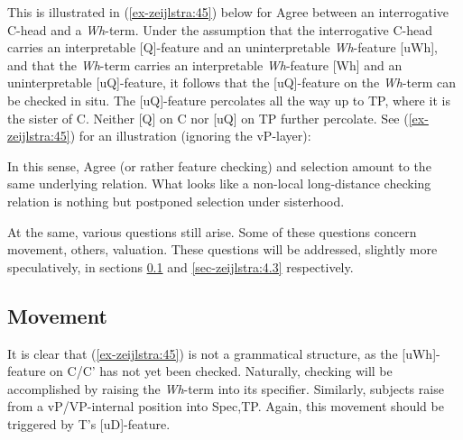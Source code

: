 \documentclass[output=paper
,modfonts
,nonflat]{langsci/langscibook}
\begin{document}
This is illustrated in (\ref{ex-zeijlstra:45}) below for Agree between an interrogative C-head and a \textit{Wh}{}-term. Under the assumption that the interrogative C-head carries an interpretable [Q]-feature and an uninterpretable \textit{Wh}-feature [uWh], and that the \textit{Wh}{}-term carries an interpretable \textit{Wh}-feature [Wh] and an uninterpretable [uQ]-feature, it follows that the [uQ]-feature on the \textit{Wh}-term can be checked in situ. The [uQ]-feature percolates all the way up to TP, where it is the sister of C. Neither [Q] on C nor [uQ] on TP further percolate. See (\ref{ex-zeijlstra:45}) for an illustration (ignoring the vP-layer):

\begin{figure}[!h]
	\begin{exe}
	\end{exe} \vspace{-0.7cm}
\end{figure}
\noindent In this sense, Agree (or rather feature checking) and selection amount to the same underlying relation. What looks like a non-local long-distance checking relation is nothing but postponed selection under sisterhood.

At the same, various questions still arise. Some of these questions concern movement, others, valuation. These questions will be addressed, slightly more speculatively, in sections \ref{sec-zeijlstra:4.2} and \ref{sec-zeijlstra:4.3} respectively.

\subsection{Movement} \label{sec-zeijlstra:4.2}
It is clear that (\ref{ex-zeijlstra:45}) is not a grammatical structure, as the [uWh]-feature on C/C’ has not yet been checked. Naturally, checking will be accomplished by raising the \textit{Wh}-term into its specifier. Similarly, subjects raise from a vP/VP-internal position into Spec,TP. Again, this movement should be triggered by T’s [uD]-feature. 
\end{document}
